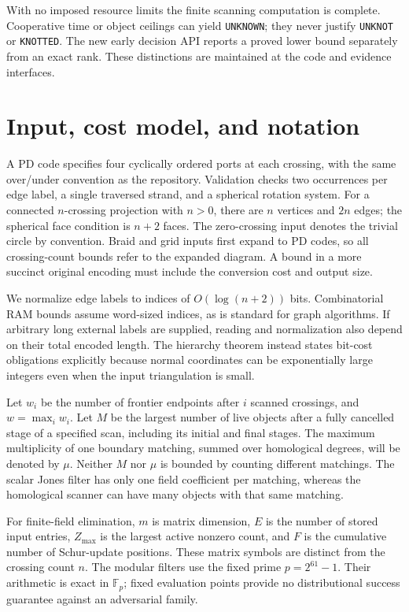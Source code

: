 \documentclass[11pt,a4paper]{article}
\theoremstyle{definition}
\theoremstyle{remark}
\newcommand{\code}[1]{\texttt{#1}}
\begin{document}
With no imposed resource limits the finite scanning computation is complete.
Cooperative time or object ceilings can yield \code{UNKNOWN}; they never
justify \code{UNKNOT} or \code{KNOTTED}.  The new early decision API reports a
proved lower bound separately from an exact rank.  These distinctions are
maintained at the code and evidence interfaces.

\section{Input, cost model, and notation}
\label{sec:model}

A PD code specifies four cyclically ordered ports at each crossing, with the
same over/under convention as the repository.  Validation checks two
occurrences per edge label, a single traversed strand, and a spherical rotation
system.  For a connected $n$-crossing projection with $n>0$, there are $n$
vertices and $2n$ edges; the spherical face condition is $n+2$ faces.  The
zero-crossing input denotes the trivial circle by convention.  Braid and grid
inputs first expand to PD codes, so all crossing-count bounds refer to the
expanded diagram.  A bound in a more succinct original encoding must include
the conversion cost and output size.

We normalize edge labels to indices of $O(\log(n+2))$ bits.  Combinatorial
RAM bounds assume word-sized indices, as is standard for graph algorithms.
If arbitrary long external labels are supplied, reading and normalization
also depend on their total encoded length.  The hierarchy theorem instead
states bit-cost obligations explicitly because normal coordinates can be
exponentially large integers even when the input triangulation is small.

Let $w_i$ be the number of frontier endpoints after $i$ scanned crossings,
and $w=\max_i w_i$.  Let $M$ be the largest number of live objects after a
fully cancelled stage of a specified scan, including its initial and final
stages.  The maximum multiplicity of one boundary matching, summed over
homological degrees, will be denoted by $\mu$.  Neither $M$ nor $\mu$ is
bounded by counting different matchings.  The scalar Jones filter has only
one field coefficient per matching, whereas the homological scanner can have
many objects with that same matching.

For finite-field elimination, $m$ is matrix dimension, $E$ is the number of
stored input entries, $Z_{\max}$ is the largest active nonzero count, and $F$
is the cumulative number of Schur-update positions.  These matrix symbols
are distinct from the crossing count $n$.  The modular filters use the fixed
prime $p=2^{61}-1$.  Their arithmetic is exact in $\mathbb F_p$; fixed
evaluation points provide no distributional success guarantee against an
adversarial family.
\end{document}
